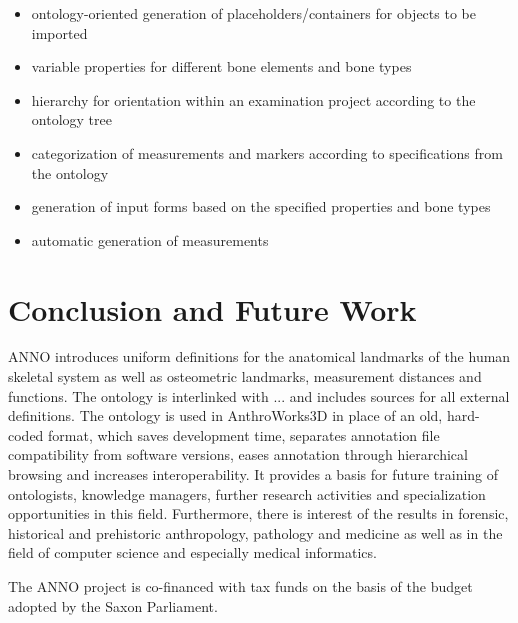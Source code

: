 \documentclass[sw]{iosart2x}
\newcommand{\aw}{AnthroWorks3D}
\begin{document}
\begin{itemize}
\item ontology-oriented generation of placeholders/containers for objects to be imported
\item variable properties for different bone elements and bone types 
\item hierarchy for orientation within an examination project according to the ontology tree
\item categorization of measurements and markers according to specifications from the ontology
\item generation of input forms based on the specified properties and bone types
\item automatic generation of measurements
\end{itemize}


\section{Conclusion and Future Work}
ANNO introduces uniform definitions for the anatomical landmarks of the human skeletal system as well as osteometric landmarks, measurement distances and functions.
The ontology is interlinked with ... and includes sources for all external definitions.
The ontology is used in \aw{} in place of an old, hard-coded format, which saves development time, separates annotation file compatibility from software versions, eases annotation through hierarchical browsing and increases interoperability.
It provides a basis for future training of ontologists, knowledge managers, further research activities and specialization opportunities in this field.
Furthermore, there is interest of the results in forensic, historical and prehistoric anthropology, pathology and medicine as well as in the field of computer science and especially medical informatics.



\begin{ack}
The ANNO project is co-financed with tax funds on the basis of the budget adopted by the Saxon Parliament.
\end{ack}

\nocite{*}


\end{document}
